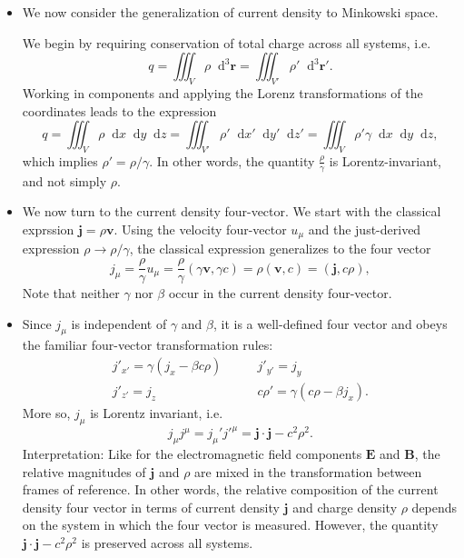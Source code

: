 \documentclass[11pt, a4paper]{article}
\newcommand{\diff}{\mathop{}\!\mathrm{d}} %
\newcommand{\dr}{\diff^{3} \r}  %
\renewcommand{\vec}[1]{\bm{#1}} %
\renewcommand{\r}{\vec{r}}
\newcommand{\E}{\vec{E}} %
\newcommand{\B}{\vec{B}} %
\renewcommand{\j}{\vec{j}}  %
\begin{document}
\begin{itemize}
	\item We now consider the generalization of current density to Minkowski space. 

    We begin by requiring conservation of total charge across all systems, i.e. 
	\begin{equation*}
		q = \iiint_{V} \rho \dr = \iiint_{V'} \rho' \dr'.
	\end{equation*}
	Working in components and applying the Lorenz transformations of the coordinates leads to the expression
	\begin{equation*}
		q = \iiint_{V}\rho \diff x \diff y \diff z = \iiint_{V'}\rho' \diff x' \diff y' \diff z' = \iiint_{V}\rho' \gamma \diff x \diff y \diff z,
	\end{equation*}
	which implies $ \rho' = \rho/\gamma $. In other words, the quantity $ \frac{\rho}{\gamma} $ is Lorentz-invariant, and not simply $ \rho $.
	
	\item We now turn to the current density four-vector. We start with the classical exprssion $ \j = \rho \vec{v} $. Using the velocity four-vector $ u_{\mu} $ and the just-derived expression $ \rho \to \rho/\gamma $, the classical expression generalizes to the four vector
	\begin{equation*}
		j_{\mu} = \frac{\rho}{\gamma} u_{\mu} = \frac{\rho}{\gamma}\left(\gamma \vec{v}, \gamma c\right) = \rho(\vec{v}, c) = (\j, c\rho),
	\end{equation*}
    Note that neither $ \gamma $ nor $ \beta $ occur in the current density four-vector.
	
	\item Since $ j_{\mu} $ is independent of $ \gamma $ and $ \beta $, it is a well-defined four vector and obeys the familiar four-vector transformation rules:
	\begin{equation*}
        \begin{array}{ll}
            j'_{x'} = \gamma (j_{x} - \beta c \rho) & \qquad j'_{y'} = j_{y}\\
            j'_{z'} = j_{z} &  \qquad c \rho' = \gamma(c \rho - \beta j_{x}).
        \end{array}
	\end{equation*}
	More so, $ j_{\mu} $ is Lorentz invariant, i.e. 
	\begin{equation*}
		j_{\mu}j^{\mu} = j_{\mu}'j'^{\mu} = \j \cdot \j - c^{2}\rho^{2}.
	\end{equation*}
    Interpretation: Like for the electromagnetic field components $ \E $ and $ \B $, the relative magnitudes of $ \j $ and $ \rho $ are mixed in the transformation between frames of reference. In other words, the relative composition of the current density four vector in terms of current density $ \j $ and charge density $ \rho $ depends on the system in which the four vector is measured. However, the quantity $ \j \cdot \j - c^{2}\rho^{2} $ is preserved across all systems.


\end{itemize}
\end{document}
